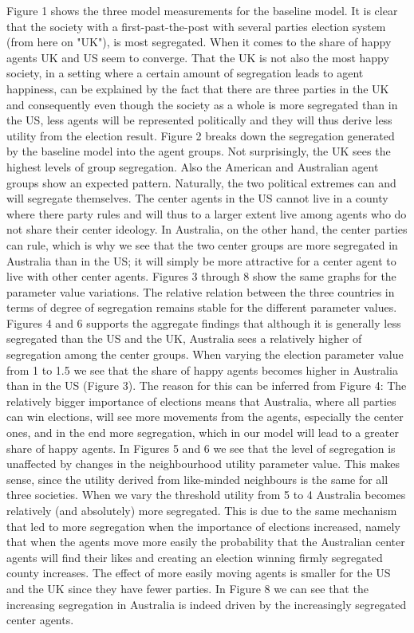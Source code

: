 \documentclass[12pt, a4paper]{article}
\begin{document}
	Figure 1 shows the three model measurements for the baseline model. It is clear that the society with a first-past-the-post with several parties election system (from here on "UK"), is most segregated. When it comes to the share of happy agents UK and US seem to converge. That the UK is not also the most happy society, in a setting where a certain amount of segregation leads to agent happiness, can be explained by the fact that there are three parties in the UK and consequently even though the society as a whole is more segregated than in the US, less agents will be represented politically and they will thus derive less utility from the election result. Figure 2 breaks down the segregation generated by the baseline model into the agent groups. Not surprisingly, the UK sees the highest levels of group segregation. Also the American and Australian agent groups show an expected pattern. Naturally, the two political extremes can and will segregate themselves. The center agents in the US cannot live in a county where there party rules and will thus to a larger extent live among agents who do not share their center ideology. In Australia, on the other hand, the center parties can rule, which is why we see that the two center groups are more segregated in Australia than in the US; it will simply be more attractive for a center agent to live with other center agents. \newline \newline
	Figures 3 through 8 show the same graphs for the parameter value variations. The relative relation between the three countries in terms of degree of segregation remains stable for the different parameter values. Figures 4 and 6 supports the aggregate findings that although it is generally less segregated than the US and the UK, Australia sees a relatively higher of segregation among the center groups. When varying the election parameter value from 1 to 1.5 we see that the share of happy agents becomes higher in Australia than in the US (Figure 3). The reason for this can be inferred from Figure 4: The relatively bigger importance of elections means that Australia, where all parties can win elections, will see more movements from the agents, especially the center ones, and in the end more segregation, which in our model will lead to a greater share of happy agents. In Figures 5 and 6 we see that the level of segregation is unaffected by changes in the neighbourhood utility parameter value. This makes sense, since the utility derived from like-minded neighbours is the same for all three societies. When we vary the threshold utility from 5 to 4 Australia becomes relatively (and absolutely) more segregated. This is due to the same mechanism that led to more segregation when the importance of elections increased, namely that when the agents move more easily the probability that the Australian center agents will find their likes and creating an election winning firmly segregated county increases. The effect of more easily moving agents is smaller for the US and the UK since they have fewer parties. In Figure 8 we can see that the increasing segregation in Australia is indeed driven by the increasingly segregated center agents.        
	
\end{document}
